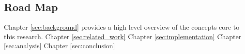 \subsection{Road Map}

Chapter \ref{sec:background} provides a high level overview of the concepts core to this research. 
Chapter \ref{sec:related_work}
Chapter \ref{sec:implementation}
Chapter \ref{sec:analysis}
Chapter \ref{sec:conclusion}